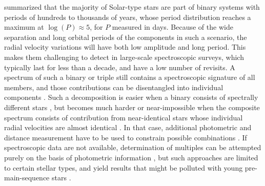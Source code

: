 \citet{2013ARA&A..51..269D} summarized that the majority of Solar-type stars are part of binary systems with periods of hundreds to thousands of years, whose period distribution reaches a maximum at $\log(P)\approx5$, for $P$ measured in days. Because of the wide separation and long orbital periods of the components in such a scenario, the radial velocity variations will have both low amplitude and long period. This makes them challenging to detect in large-scale spectroscopic surveys, which typically last for less than a decade, and have a low number of revisits. A spectrum of such a binary or triple still contains a spectroscopic signature of all members, and those contributions can be disentangled into individual components \citep{2018MNRAS.473.5043E, 2018MNRAS.476..528E}. Such a decomposition is easier when a binary consists of spectrally different stars \citep{2005A&A...440..995S, 2007MNRAS.382.1377R, 2012MNRAS.419..806R, 2013AJ....146...82R, 2016MNRAS.458.3808R}, but becomes much harder or near-impossible when the composite spectrum consists of contribution from near-identical stars whose individual radial velocities are almost identical \citep{2015IJAsB..14..173B}. In that case, additional photometric and distance measurement have to be used to constrain possible combinations \citep{2018ApJ...857..114W}. If spectroscopic data are not available, determination of multiples can be attempted purely on the basis of photometric information \citep{1997A&A...327..598F, 1998MNRAS.300..977H, 2016MNRAS.455.3009M, 2018ApJ...857..114W}, but such approaches are limited to certain stellar types, and yield results that might be polluted with young pre-main-sequence stars \citep{2018arXiv181010435Z}.


